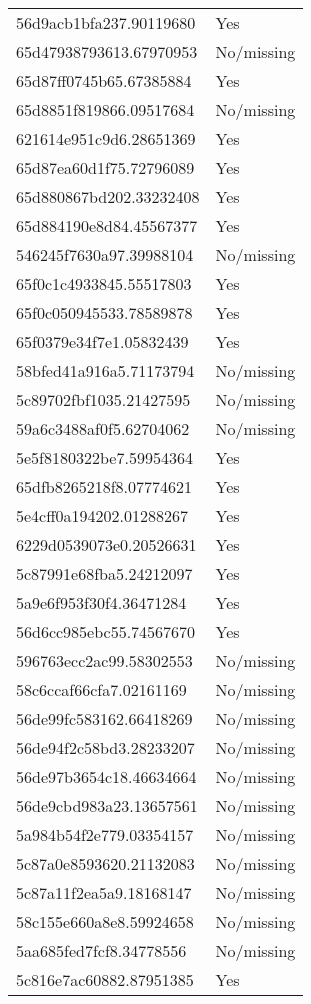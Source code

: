 \begin{tabular}{ll}
56d9acb1bfa237.90119680 & Yes \\
65d47938793613.67970953 & No/missing \\
65d87ff0745b65.67385884 & Yes \\
65d8851f819866.09517684 & No/missing \\
621614e951c9d6.28651369 & Yes \\
65d87ea60d1f75.72796089 & Yes \\
65d880867bd202.33232408 & Yes \\
65d884190e8d84.45567377 & Yes \\
546245f7630a97.39988104 & No/missing \\
65f0c1c4933845.55517803 & Yes \\
65f0c050945533.78589878 & Yes \\
65f0379e34f7e1.05832439 & Yes \\
58bfed41a916a5.71173794 & No/missing \\
5c89702fbf1035.21427595 & No/missing \\
59a6c3488af0f5.62704062 & No/missing \\
5e5f8180322be7.59954364 & Yes \\
65dfb8265218f8.07774621 & Yes \\
5e4cff0a194202.01288267 & Yes \\
6229d0539073e0.20526631 & Yes \\
5c87991e68fba5.24212097 & Yes \\
5a9e6f953f30f4.36471284 & Yes \\
56d6cc985ebc55.74567670 & Yes \\
596763ecc2ac99.58302553 & No/missing \\
58c6ccaf66cfa7.02161169 & No/missing \\
56de99fc583162.66418269 & No/missing \\
56de94f2c58bd3.28233207 & No/missing \\
56de97b3654c18.46634664 & No/missing \\
56de9cbd983a23.13657561 & No/missing \\
5a984b54f2e779.03354157 & No/missing \\
5c87a0e8593620.21132083 & No/missing \\
5c87a11f2ea5a9.18168147 & No/missing \\
58c155e660a8e8.59924658 & No/missing \\
5aa685fed7fcf8.34778556 & No/missing \\
5c816e7ac60882.87951385 & Yes \\

\end{tabular}
